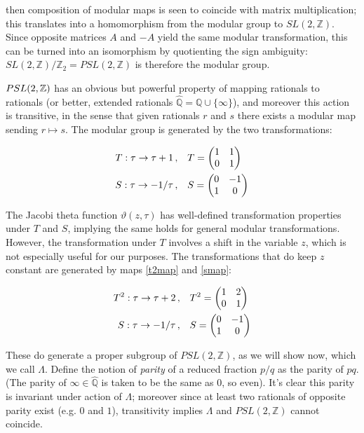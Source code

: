 \documentclass{article}
\begin{document}
then composition of modular maps is seen to coincide with matrix multiplication; this translates into a homomorphism from the modular group to $SL(2,\mathbb{Z})$. Since opposite matrices $A$ and $-A$ yield the same modular transformation, this can be turned into an isomorphism by quotienting the sign ambiguity: $SL(2,\mathbb{Z})/\mathbb{Z}_2 = PSL(2,\mathbb{Z})$ is therefore the modular group.

$PSL(2,\mathbb{Z})$ has an obvious but powerful property of mapping rationals to rationals (or better, extended rationals $\hat{\mathbb{Q}} = \mathbb{Q} \cup \{\infty\}$), and moreover this action is transitive, in the sense that given rationals $r$ and $s$ there exists a modular map sending $r\mapsto s$. The modular group is generated by the two transformations:

\begin{align}
   && T : \tau \rightarrow \tau + 1\,, \quad& T=\mqty(1 & 1 \\ 0 & 1) && \\
   && S : \tau \rightarrow -1/\tau\,, \quad& S=\mqty(0 & -1 \\ 1 & 0) &&
\end{align}

The Jacobi theta function $\vartheta(z,\tau)$ has well-defined transformation properties under $T$ and $S$, implying the same holds for general modular transformations. However, the transformation under $T$ involves a shift in the variable $z$, which is not especially useful for our purposes. The transformations that do keep $z$ constant are generated by maps \eqref{t2map} and \eqref{smap}:

\begin{align}
   && T^2 : \tau \rightarrow \tau + 2\,, \quad& T^2=\mqty(1 & 2 \\ 0 & 1) && \\
   && S : \tau \rightarrow -1/\tau\,, \quad& S=\mqty(0 & -1 \\ 1 & 0) &&
\end{align}

\newcommand{\emodg}{\Lambda}

These do generate a proper subgroup of $PSL(2,\mathbb{Z})$, as we will show now, which we call $\emodg$. Define the notion of \emph{parity} of a reduced fraction $p/q$ as the parity of $pq$. (The parity of $\infty \in \hat{\mathbb{Q}}$ is taken to be the same as $0$, so even). It's clear this parity is invariant under action of $\emodg$; moreover since at least two rationals of opposite parity exist (e.g. $0$ and $1$), transitivity implies $\emodg$ and $PSL(2,\mathbb{Z})$ cannot coincide.
\end{document}
